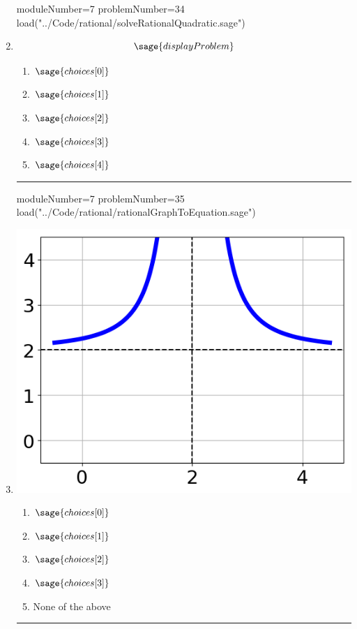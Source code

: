 \documentclass[14pt]{article}
\newcommand{\litem}[1]{\item#1\hspace*{-1cm}\rule{\textwidth}{0.4pt}}
\begin{document}
\begin{enumerate}
\begin{sagesilent}
moduleNumber=7
problemNumber=34
load("../Code/rational/solveRationalQuadratic.sage")
\end{sagesilent}

\litem{ 

	\[ \sage{displayProblem} \]

	\begin{enumerate}[label=\Alph*.]
    \item \( \sage{choices[0]} \)
    \item \( \sage{choices[1]} \)
    \item \( \sage{choices[2]} \)
    \item \( \sage{choices[3]} \)
    \item \( \sage{choices[4]} \)
	\end{enumerate}
}

\begin{sagesilent}
moduleNumber=7
problemNumber=35
load("../Code/rational/rationalGraphToEquation.sage")
\end{sagesilent}

\litem{ 

\begin{multicols}{2}
\begin{center}
\includegraphics[width=.3\textwidth]{../Figures/rationalGraphToEquationB.png}
\end{center}

\columnbreak

	\begin{enumerate}[label=\Alph*.]
		\item \( \sage{choices[0]} \)
		\item \( \sage{choices[1]} \)
		\item \( \sage{choices[2]} \)
		\item \( \sage{choices[3]} \)
    \item None of the above
	\end{enumerate}
\end{multicols}
}

\end{enumerate}
\end{document}
